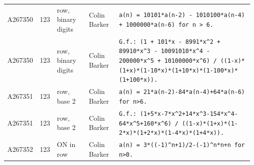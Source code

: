 \documentclass[11pt]{article}
\theoremstyle{definition}
\theoremstyle{remark}
\begin{document}
{\begin{longtable}{p{1.3cm}p{0.7cm}p{2.4cm}p{2.3cm}p{7.3cm}}
A267350 & 123 & row, binary digits & Colin Barker & \texttt{a(n)\allowbreak{} \allowbreak{}=\allowbreak{} \allowbreak{}10101*\allowbreak{}a(n-\allowbreak{}2)\allowbreak{} \allowbreak{}-\allowbreak{} \allowbreak{}1010100*\allowbreak{}a(n-\allowbreak{}4)\allowbreak{} \allowbreak{}+\allowbreak{} \allowbreak{}1000000*\allowbreak{}a(n-\allowbreak{}6)\allowbreak{} \allowbreak{}for \allowbreak{}n \allowbreak{}> \allowbreak{}6.} \\
A267350 & 123 & row, binary digits & Colin Barker & \texttt{G.f.: \allowbreak{}(1 \allowbreak{}+\allowbreak{} \allowbreak{}101*\allowbreak{}x \allowbreak{}-\allowbreak{} \allowbreak{}8991*\allowbreak{}x\^{}2 \allowbreak{}+\allowbreak{} \allowbreak{}89910*\allowbreak{}x\^{}3 \allowbreak{}-\allowbreak{} \allowbreak{}10091010*\allowbreak{}x\^{}4 \allowbreak{}-\allowbreak{} \allowbreak{}200000*\allowbreak{}x\^{}5 \allowbreak{}+\allowbreak{} \allowbreak{}10100000*\allowbreak{}x\^{}6)\allowbreak{} \allowbreak{}/\allowbreak{} \allowbreak{}((1-\allowbreak{}x)\allowbreak{}*\allowbreak{}(1+\allowbreak{}x)\allowbreak{}*\allowbreak{}(1-\allowbreak{}10*\allowbreak{}x)\allowbreak{}*\allowbreak{}(1+\allowbreak{}10*\allowbreak{}x)\allowbreak{}*\allowbreak{}(1-\allowbreak{}100*\allowbreak{}x)\allowbreak{}*\allowbreak{}(1+\allowbreak{}100*\allowbreak{}x)\allowbreak{})\allowbreak{}.} \\
A267351 & 123 & row, base 2 & Colin Barker & \texttt{a(n)\allowbreak{} \allowbreak{}=\allowbreak{} \allowbreak{}21*\allowbreak{}a(n-\allowbreak{}2)\allowbreak{}-\allowbreak{}84*\allowbreak{}a(n-\allowbreak{}4)\allowbreak{}+\allowbreak{}64*\allowbreak{}a(n-\allowbreak{}6)\allowbreak{} \allowbreak{}for \allowbreak{}n>6.} \\
A267351 & 123 & row, base 2 & Colin Barker & \texttt{G.f.: \allowbreak{}(1+\allowbreak{}5*\allowbreak{}x-\allowbreak{}7*\allowbreak{}x\^{}2+\allowbreak{}14*\allowbreak{}x\^{}3-\allowbreak{}154*\allowbreak{}x\^{}4-\allowbreak{}64*\allowbreak{}x\^{}5+\allowbreak{}160*\allowbreak{}x\^{}6)\allowbreak{} \allowbreak{}/\allowbreak{} \allowbreak{}((1-\allowbreak{}x)\allowbreak{}*\allowbreak{}(1+\allowbreak{}x)\allowbreak{}*\allowbreak{}(1-\allowbreak{}2*\allowbreak{}x)\allowbreak{}*\allowbreak{}(1+\allowbreak{}2*\allowbreak{}x)\allowbreak{}*\allowbreak{}(1-\allowbreak{}4*\allowbreak{}x)\allowbreak{}*\allowbreak{}(1+\allowbreak{}4*\allowbreak{}x)\allowbreak{})\allowbreak{}.} \\
A267352 & 123 & ON in row & Colin Barker & \texttt{a(n)\allowbreak{} \allowbreak{}=\allowbreak{} \allowbreak{}3*\allowbreak{}((-\allowbreak{}1)\allowbreak{}\^{}n+\allowbreak{}1)\allowbreak{}/\allowbreak{}2-\allowbreak{}(-\allowbreak{}1)\allowbreak{}\^{}n*\allowbreak{}n+\allowbreak{}n \allowbreak{}for \allowbreak{}n>0.} \\

\end{longtable}}
\end{document}
